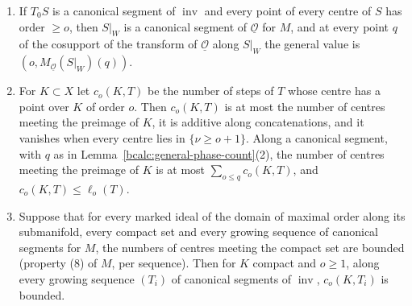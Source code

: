 \begin{lemma}
\begin{enumerate}
\item If \(T_0S\) is a canonical segment of \(\operatorname{inv}\) and every point of every centre of \(S\) has order \(\ge o\), then \(S|_W\) is a canonical segment of
\(\underline{\mathcal O}\) for \(M\), and at every point \(q\) of the cosupport of the transform of \(\underline{\mathcal O}\) along \(S|_W\) the general value is
\((o,M_{\underline{\mathcal O}}(S|_W)(q))\).
\item For \(K\subset X\) let \(c_o(K,T)\) be the number of steps of \(T\) whose centre has a point over \(K\) of order \(o\). Then \(c_o(K,T)\) is at most the number of
centres meeting the preimage of \(K\), it is additive along concatenations, and it vanishes when every centre lies in \(\{\nu\ge o+1\}\). Along a canonical segment, with \(q\) as in
Lemma~\ref{bcalc:general-phase-count}(2), the number of centres meeting the preimage of \(K\) is at most \(\sum_{o\le q}c_o(K,T)\), and \(c_o(K,T)\le\ell_o(T)\).
\item Suppose that for every marked ideal of the domain of maximal order along its submanifold, every compact set and every growing sequence of canonical segments for
\(M\), the numbers of centres meeting the compact set are bounded (property (8) of \(M\), per sequence). Then for \(K\) compact and \(o\ge1\), along every growing
sequence \((T_i)\) of canonical segments of \(\operatorname{inv}\), \(c_o(K,T_i)\) is bounded.
\end{enumerate}
\end{lemma}

